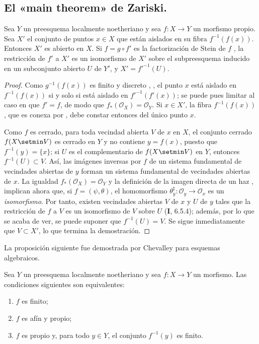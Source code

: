 \subsection{El «main theorem» de Zariski.}
\label{subsection:III.4.4-fr}

\begin{proposition}[4.4.1]
\label{III.4.4.1}
\label{III.4.4.1-fr}
Sea $Y$ un preesquema localmente noetheriano y sea $f:X\to Y$ un
morfismo propio. Sea $X'$ el conjunto de puntos $x\in X$ que están
aislados en su fibra $f^{-1}(f(x))$. Entonces $X'$ es abierto en $X$.
Si
$f=g\circ f'$
es la factorización de Stein de $f$ , la restricción
de $f'$ a $X'$ es un isomorfismo de $X'$ sobre el subpreesquema inducido
en un subconjunto abierto $U$ de $Y'$, y
$X'=f'^{-1}(U)$.
\end{proposition}

\begin{proof}
Como $g^{-1}(f(x))$ es finito y discreto
, , el punto $x$ está aislado en
$f^{-1}(f(x))$ si y solo si está aislado en
$f'^{-1}(f'(x))$; se puede pues limitar al caso en que $f'=f$, de
modo que $f_*(\mathcal O_X)=\mathcal O_Y$. Si $x\in X'$, la fibra
$f^{-1}(f(x))$, que es conexa por , debe constar
entonces del único punto $x$.

Como $f$ es cerrado, para toda vecindad abierta $V$ de $x$ en $X$, el
conjunto cerrado $f(X\setmin V)$ es cerrado en $Y$ y no contiene
$y=f(x)$, puesto que $f^{-1}(y)=\{x\}$; si $U$ es el complementario de
$f(X\setmin V)$ en $Y$, entonces $f^{-1}(U)\subset V$. Así, las
imágenes inversas por $f$ de un sistema fundamental de vecindades
abiertas de $y$ forman un sistema fundamental de vecindades abiertas de
$x$. La igualdad $f_*(\mathcal O_X)=\mathcal O_Y$ y la definición de la
imagen directa de un haz ,  implican
ahora que, si $f=(\psi,\theta)$, el homomorfismo
$\theta_y^\sharp:\mathcal O_y\to\mathcal O_x$
es un \emph{isomorfismo}. Por tanto, existen vecindades abiertas $V$ de $x$ y
$U$ de $y$ tales que la restricción de $f$ a $V$ es un isomorfismo de $V$ sobre
$U$ (\textbf{I}, 6.5.4); además, por lo que se acaba de ver,
se puede suponer que $f^{-1}(U)=V$. Se sigue inmediatamente que $V\subset X'$, lo que
termina la demostración.
\end{proof}

La proposición siguiente fue demostrada por Chevalley para esquemas
algebraicos.

\begin{proposition}[4.4.2]
\label{III.4.4.2}
\label{III.4.4.2-fr}
Sea $Y$ un preesquema localmente noetheriano y sea $f:X\to Y$ un
morfismo. Las condiciones siguientes son equivalentes:
\begin{enumerate}
  \item[{\rm a)}] $f$ es finito;
  \item[{\rm b)}] $f$ es afín y propio;
  \item[{\rm c)}] $f$ es propio y, para todo $y\in Y$, el conjunto
    $f^{-1}(y)$ es finito.
\end{enumerate}
\end{proposition}

